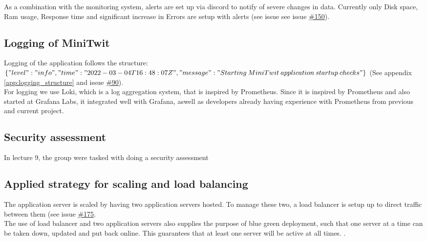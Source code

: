 As a combination with the monitoring system, alerts are set up via discord to notify of severe changes in data. Currently only Disk space, Ram usage, Response time and significant increase in Errors are setup with alerts (see issue see issue \href{https://github.com/DevelOpsITU/MiniTwit/issues/150}{\#150}).


\subsection{Logging of MiniTwit}
Logging of the application follows the structure: \\
$\{"level":"info","time":"2022-03-04T16:48:07Z",\\"message":"Starting\: MiniTwit\: application\: startup\: checks"\}$ (See appendix \ref{app:logging_structure} and issue \href{https://github.com/DevelOpsITU/MiniTwit/issues/90}{\#90}).\\

For logging we use Loki, which is a log aggregation system, that is inspired by Prometheus\cite{grafana_loki}\cite{grafana_loki_docs}. Since it is inspired by Prometheus and also started at Grafana Labs, it integrated well with Grafana, aswell as developers already having experience with Prometheus from previous and current project. 

\subsection{Security assessment}
In lecture 9, the group were tasked with doing a security assessment  


\subsection{Applied strategy for scaling and load balancing}
The application server is scaled by having two application servers hosted. To manage these two, a load balancer is setup up to direct traffic between them (see issue \href{https://github.com/DevelOpsITU/MiniTwit/issues/175}{\#175}. \\
The use of load balancer and two application servers also supplies the purpose of blue green deployment, such that one server at a time can be taken down, updated and put back online. This guarantees that at least one server will be active at all times.  \cite{blue_green_deployment}.


